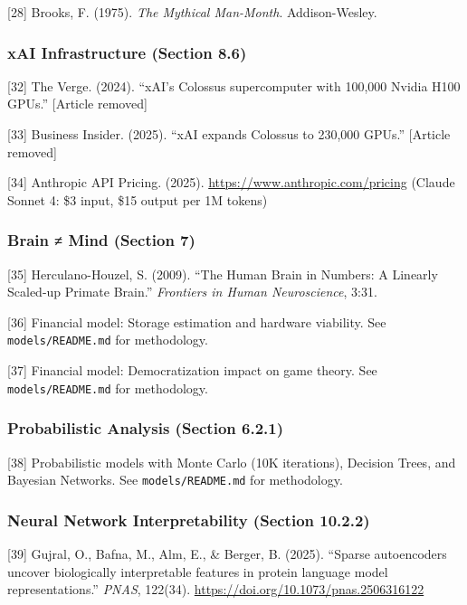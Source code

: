 \documentclass[
  11pt,
]{article}
\begin{document}
{[}28{]} Brooks, F. (1975). \emph{The Mythical Man-Month}.
Addison-Wesley.

\subsubsection{xAI Infrastructure (Section
8.6)}\label{xai-infrastructure-section-8.6}

{[}32{]} The Verge. (2024). ``xAI's Colossus supercomputer with 100,000
Nvidia H100 GPUs.'' {[}Article removed{]}

{[}33{]} Business Insider. (2025). ``xAI expands Colossus to 230,000
GPUs.'' {[}Article removed{]}

{[}34{]} Anthropic API Pricing. (2025).
\url{https://www.anthropic.com/pricing} (Claude Sonnet 4: \$3 input,
\$15 output per 1M tokens)

\subsubsection{Brain ≠ Mind (Section 7)}\label{brain-mind-section-7}

{[}35{]} Herculano-Houzel, S. (2009). ``The Human Brain in Numbers: A
Linearly Scaled-up Primate Brain.'' \emph{Frontiers in Human
Neuroscience}, 3:31.

{[}36{]} Financial model: Storage estimation and hardware viability. See
\texttt{models/README.md} for methodology.

{[}37{]} Financial model: Democratization impact on game theory. See
\texttt{models/README.md} for methodology.

\subsubsection{Probabilistic Analysis (Section
6.2.1)}\label{probabilistic-analysis-section-6.2.1}

{[}38{]} Probabilistic models with Monte Carlo (10K iterations),
Decision Trees, and Bayesian Networks. See \texttt{models/README.md} for
methodology.

\subsubsection{Neural Network Interpretability (Section
10.2.2)}\label{neural-network-interpretability-section-10.2.2}

{[}39{]} Gujral, O., Bafna, M., Alm, E., \& Berger, B. (2025). ``Sparse
autoencoders uncover biologically interpretable features in protein
language model representations.'' \emph{PNAS}, 122(34).
\url{https://doi.org/10.1073/pnas.2506316122}
\end{document}
